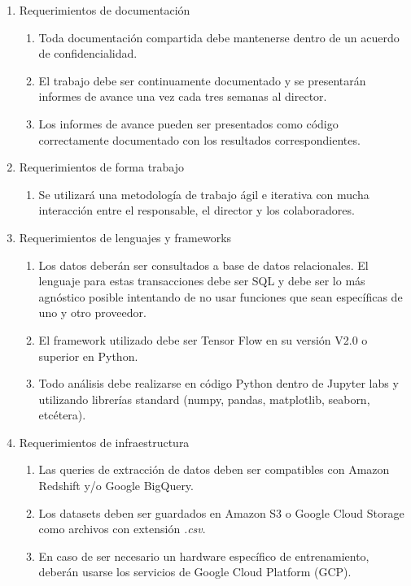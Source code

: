 \documentclass[
11pt, %
]{charter}
\begin{document}
\begin{enumerate}
	\item Requerimientos de documentación
		\begin{enumerate}
			\item Toda documentación compartida debe mantenerse dentro de un acuerdo de confidencialidad.
			\item El trabajo debe ser continuamente documentado y se presentarán informes de avance una vez cada tres semanas al director.
			\item Los informes de avance pueden ser presentados como código correctamente documentado con los resultados correspondientes.
		\end{enumerate}
	\item Requerimientos de forma trabajo
		\begin{enumerate}
			\item Se utilizará una metodología de trabajo ágil e iterativa con mucha interacción entre el responsable, el director y los colaboradores.
		\end{enumerate}
	\item Requerimientos de lenguajes y frameworks
		\begin{enumerate}
			\item Los datos deberán ser consultados a base de datos relacionales. El lenguaje para estas transacciones debe ser SQL y debe ser lo más agnóstico posible intentando de no usar funciones que sean específicas de uno y otro proveedor.
			\item El framework utilizado debe ser Tensor Flow en su versión V2.0 o superior en Python.
			\item Todo análisis debe realizarse en código Python dentro de Jupyter labs y utilizando librerías standard  (numpy, pandas, matplotlib, seaborn, etcétera).
		\end{enumerate}
	\item Requerimientos de infraestructura
		\begin{enumerate}
			\item Las queries de extracción de datos deben ser compatibles con Amazon Redshift y/o Google BigQuery.
			\item Los datasets deben ser guardados en Amazon S3 o Google Cloud Storage como archivos con extensión \emph{.csv}.
			\item En caso de ser necesario un hardware específico de entrenamiento, deberán usarse los servicios de Google Cloud Platform (GCP).
		\end{enumerate}

\end{enumerate}
\end{document}
